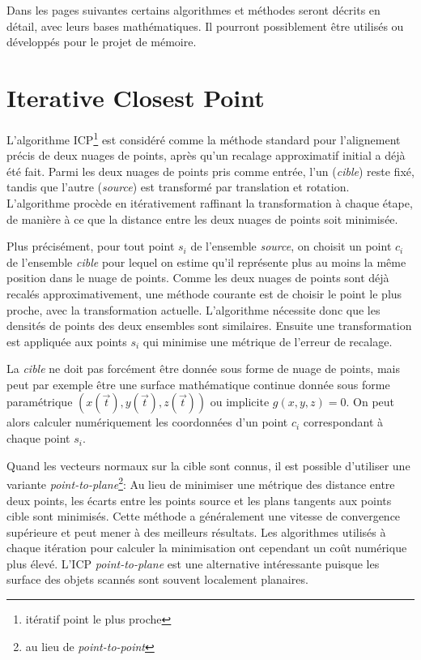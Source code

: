 \documentclass[a4paper,10pt]{scrreprt}
\begin{document}
Dans les pages suivantes certains algorithmes et méthodes seront décrits en détail, avec leurs bases mathématiques. Il pourront possiblement être utilisés ou développés pour le projet de mémoire.


\section{Iterative Closest Point}
L'algorithme ICP\footnote{itératif point le plus proche} est considéré comme la méthode standard pour l'alignement précis de deux nuages de points, après qu'un recalage approximatif initial a déjà été fait. Parmi les deux nuages de points pris comme entrée, l'un (\emph{cible}) reste fixé, tandis que l'autre (\emph{source}) est transformé par translation et rotation. L'algorithme procède en itérativement raffinant la transformation à chaque étape, de manière à ce que la distance entre les deux nuages de points soit minimisée.

Plus précisément, pour tout point $s_i$ de l'ensemble \emph{source}, on choisit un point $c_i$ de l'ensemble \emph{cible} pour lequel on estime qu'il représente plus au moins la même position dans le nuage de points. Comme les deux nuages de points sont déjà recalés approximativement, une méthode courante est de choisir le point le plus proche, avec la transformation actuelle. L'algorithme nécessite donc que les densités de points des deux ensembles sont similaires. Ensuite une transformation est appliquée aux points $s_i$ qui minimise une métrique de l'erreur de recalage.

La \emph{cible} ne doit pas forcément être donnée sous forme de nuage de points, mais peut par exemple être une surface mathématique continue donnée sous forme paramétrique $(x(\vec{t}),y(\vec{t}),z(\vec{t}))$ ou implicite $g(x, y, z) = 0$. On peut alors calculer numériquement les coordonnées d'un point $c_i$ correspondant à chaque point $s_i$. \cite{Besl1992}

Quand les vecteurs normaux sur la cible sont connus, il est possible d'utiliser une variante \emph{point-to-plane}\footnote{au lieu de \emph{point-to-point}}: Au lieu de minimiser une métrique des distance entre deux points, les écarts entre les points source et les plans tangents aux points cible sont minimisés. Cette méthode a généralement une vitesse de convergence supérieure et peut mener à des meilleurs résultats. Les algorithmes utilisés à chaque itération pour calculer la minimisation ont cependant un coût numérique plus élevé. L'ICP \emph{point-to-plane} est une alternative intéressante puisque les surface des objets scannés sont souvent localement planaires. \cite{Low2004}
\end{document}
